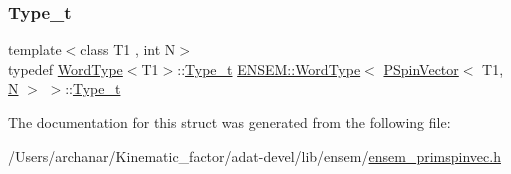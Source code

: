 \subsubsection{\texorpdfstring{Type\_t}{Type\_t}\hspace{0.1cm}{\footnotesize\ttfamily [3/3]}}
{\footnotesize\ttfamily template$<$class T1 , int N$>$ \\
typedef \mbox{\hyperlink{structENSEM_1_1WordType}{Word\+Type}}$<$T1$>$\+::\mbox{\hyperlink{structENSEM_1_1WordType_3_01PSpinVector_3_01T1_00_01N_01_4_01_4_addbb91e7d2c1c1c79f012acf1cd02ce3}{Type\+\_\+t}} \mbox{\hyperlink{structENSEM_1_1WordType}{E\+N\+S\+E\+M\+::\+Word\+Type}}$<$ \mbox{\hyperlink{classENSEM_1_1PSpinVector}{P\+Spin\+Vector}}$<$ T1, \mbox{\hyperlink{adat__devel_2lib_2hadron_2operator__name__util_8cc_a7722c8ecbb62d99aee7ce68b1752f337}{N}} $>$ $>$\+::\mbox{\hyperlink{structENSEM_1_1WordType_3_01PSpinVector_3_01T1_00_01N_01_4_01_4_addbb91e7d2c1c1c79f012acf1cd02ce3}{Type\+\_\+t}}}



The documentation for this struct was generated from the following file\+:\begin{DoxyCompactItemize}
\item 
/\+Users/archanar/\+Kinematic\+\_\+factor/adat-\/devel/lib/ensem/\mbox{\hyperlink{adat-devel_2lib_2ensem_2ensem__primspinvec_8h}{ensem\+\_\+primspinvec.\+h}}\end{DoxyCompactItemize}
